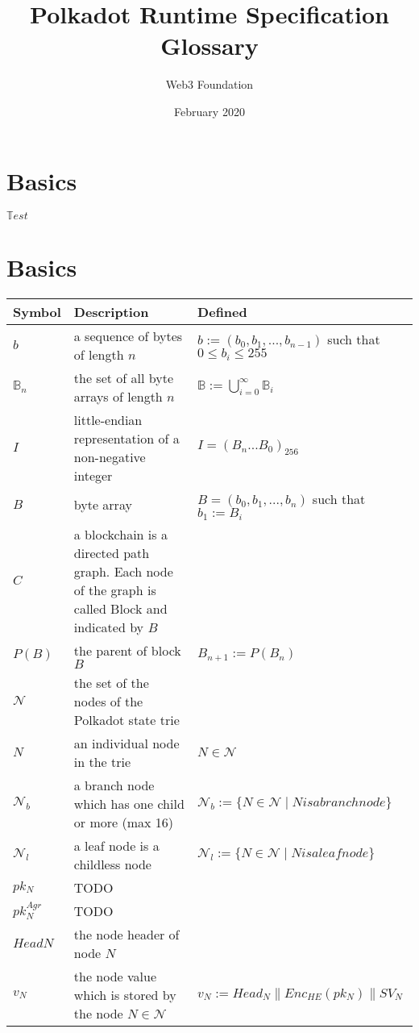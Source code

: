 \documentclass[11pt,a4paper]{article}
\begin{document}
\title{Polkadot Runtime Specification Glossary}
\author{Web3 Foundation}
\date{February 2020}
\maketitle
\section{Basics}

\(\mathbb Test\)

\section*{Basics}
\begin{center}
 \begin{tabulary}{1.0\textwidth}{LLL}
  \textbf{Symbol} & \textbf{Description} & \textbf{Defined} \\
  \hline
\(b\) &a sequence of bytes of length \(n\) & \(b:=(b_0,b_1,...,b_{n-1})\) such that \(0 \leq b_i \leq 255\) \\
\(\mathbb B_n\) &the set of all byte arrays of length \(n\) & \(\mathbb B:=\displaystyle\bigcup^\infty_{i=0} \mathbb B_i\) \\
\(I\) &little-endian representation of a non-negative integer& \(I=(B_n...B_0)_{256}\) \\
\(B\) &byte array& \(B = (b_0,b_1,...,b_n)\) such that \(b_1:=B_i\) \\
\(C\) &a blockchain is a directed path graph. Each node of the graph is called Block and indicated by \(B\) &\\
\(P(B)\) &the parent of block \(B\) & \(B_{n+1}:=P(B_n)\) \\
\(\mathcal N\) &the set of the nodes of the Polkadot state trie&\\
\(N\) &an individual node in the trie& \(N \in \mathcal N\) \\
\(\mathcal N_b\) &a branch node which has one child or more (max 16)& \(\mathcal N_b:=\{N \in \mathcal N \mid N is a branch node\}\) \\
\(\mathcal N_l\) &a leaf node is a childless node& \(\mathcal N_l:=\{N \in \mathcal N \mid N is a leaf node\}\) \\
\(pk_N\) &TODO&\\
\(pk^{Agr}_N\) &TODO&\\
\(HeadN\) &the node header of node \(N\) &\\
\(v_N\) &the node value which is stored by the node \(N \in \mathcal N\) & \(v_N := Head_N\parallel Enc_{HE}(pk_N)\parallel SV_N\) \\
 \end{tabulary}
\end{center}
\end{document}
